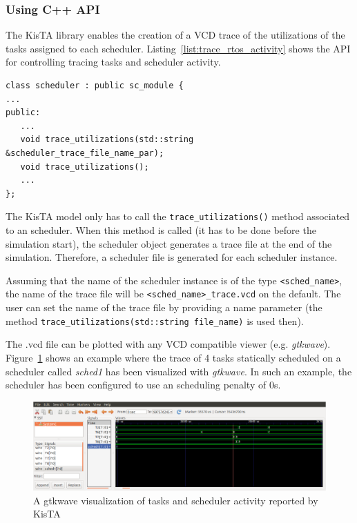 \subsubsection{Using C++ API}
\label{sec:tracing_cpp_api}

The KisTA library enables the creation of a VCD trace of the utilizations of the tasks assigned to each scheduler.
%
Listing~\ref{list:trace_rtos_activity} shows the API for controlling tracing tasks and scheduler activity.

\begin{lstlisting}[style=KistaCodeStyle,caption={API for controling tracing tasks and scheduler activity.},label=list:trace_rtos_activity]
class scheduler : public sc_module {
...
public:
   ...
   void trace_utilizations(std::string &scheduler_trace_file_name_par);
   void trace_utilizations();
   ...
};
\end{lstlisting}

The KisTA model only has to call the \texttt{trace\_utilizations()} method associated to an scheduler.
%
When this method is called (it has to be done before the simulation start), the scheduler object generates a trace file at the end of the simulation.
%
Therefore, a scheduler file is generated for each scheduler instance. 

Assuming that the name of the scheduler instance is of the type \texttt{<sched\_name>},
the name of the trace file will be \texttt{<sched\_name>\_trace.vcd} on the default.
The user can set the name of the trace file by providing a name parameter (the method \texttt{trace\_utilizations(std::string file\_name)} is used then).

The .vcd file can be plotted with any VCD compatible viewer (e.g. \emph{gtkwave}).
Figure~\ref{fig:trace_example} shows an example where the trace of 4 tasks statically scheduled on
a scheduler called \emph{sched1} has been visualized with \emph{gtkwave}.
In such an example, the scheduler has been configured to use an scheduling penalty of 0s.

\begin{figure}[h]
\centering
\includegraphics[width=\textwidth]{./figs/trace_sched1_static_sched.png} 
\caption{A gtkwave visualization of tasks and scheduler activity reported by KisTA} 
\label{fig:trace_example}
\end{figure}

